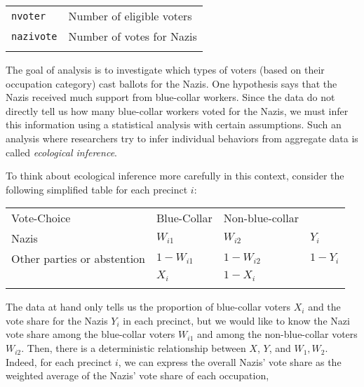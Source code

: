 \documentclass[]{article}
\begin{document}
\begin{longtable}[c]{@{}ll@{}}
\begin{minipage}[t]{0.24\columnwidth}
\texttt{nvoter}
\end{minipage} & \begin{minipage}[t]{0.69\columnwidth}\raggedright
Number of eligible voters
\end{minipage}
\\\addlinespace
\begin{minipage}[t]{0.24\columnwidth}\raggedright
\texttt{nazivote}
\end{minipage} & \begin{minipage}[t]{0.69\columnwidth}\raggedright
Number of votes for Nazis
\end{minipage}
\\\addlinespace
\bottomrule
\end{longtable}

The goal of analysis is to investigate which types of voters (based on
their occupation category) cast ballots for the Nazis. One hypothesis
says that the Nazis received much support from blue-collar workers.
Since the data do not directly tell us how many blue-collar workers
voted for the Nazis, we must infer this information using a statistical
analysis with certain assumptions. Such an analysis where researchers
try to infer individual behaviors from aggregate data is called
\emph{ecological inference}.

To think about ecological inference more carefully in this context,
consider the following simplified table for each precinct $i$:

\begin{longtable}[c]{@{}llll@{}}
\toprule\addlinespace
Vote-Choice & Blue-Collar & Non-blue-collar &
\\\addlinespace
\midrule\endhead
Nazis & $W_{i1}$ & $W_{i2}$ & $Y_i$
\\\addlinespace
Other parties or abstention & $1-W_{i1}$ & $1-W_{i2}$ & $1-Y_i$
\\\addlinespace
& $X_i$ & $1-X_i$ &
\\\addlinespace
\bottomrule
\end{longtable}

The data at hand only tells us the proportion of blue-collar voters
$X_i$ and the vote share for the Nazis $Y_i$ in each precinct, but we
would like to know the Nazi vote share among the blue-collar voters
$W_{i1}$ and among the non-blue-collar voters $W_{i2}$. Then, there is a
deterministic relationship between $X$, $Y$, and $W_1, W_2$. Indeed, for
each precinct $i$, we can express the overall Nazis' vote share as the
weighted average of the Nazis' vote share of each occupation,
\end{document}
